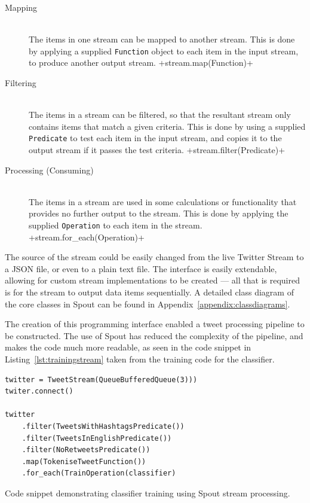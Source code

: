 \documentclass[11pt,a4paper]{report}
\begin{document}
\begin{description}
    \item[Mapping] \hfill \\
        The items in one stream can be mapped to another stream. This is done by applying a supplied \verb+Function+ object to each item in the input stream, to produce another output stream.
        +stream.map(Function)+
    \item[Filtering] \hfill \\
        The items in a stream can be filtered, so that the resultant stream only contains items that match a given criteria. This is done by using a supplied \verb+Predicate+ to test each item in the input stream, and copies it to the output stream if it passes the test criteria.
        +stream.filter(Predicate)+
    \item[Processing (Consuming)] \hfill \\
        The items in a stream are used in some calculations or functionality that provides no further output to the stream. This is done by applying the supplied \verb+Operation+ to each item in the stream.
        +stream.for_each(Operation)+
\end{description}

The source of the stream could be easily changed from the live Twitter Stream to a JSON file, or even to a plain text file. The interface is easily extendable, allowing for custom stream implementations to be created --- all that is required is for the stream to output data items sequentially. A detailed class diagram of the core classes in Spout can be found in Appendix~\ref{appendix:classdiagrams}.

The creation of this programming interface enabled a tweet processing pipeline to be constructed. The use of Spout has reduced the complexity of the pipeline, and makes the code much more readable, as seen in the code snippet in Listing~\ref{lst:trainingstream} taken from the training code for the classifier.

\begin{listing}[htpb]
    \begin{verbatim}
twitter = TweetStream(QueueBufferedQueue(3)))
twiter.connect()

twitter
    .filter(TweetsWithHashtagsPredicate())
    .filter(TweetsInEnglishPredicate())
    .filter(NoRetweetsPredicate())
    .map(TokeniseTweetFunction())
    .for_each(TrainOperation(classifier)
    \end{verbatim}
    \caption{Code snippet demonstrating classifier training using Spout stream processing.}
    \label{lst:trainingstream}
\end{listing}
\end{document}
